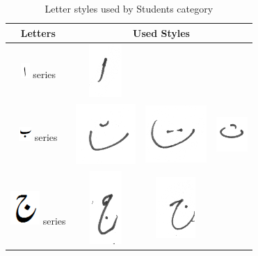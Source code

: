 \documentclass[a4paper,conference]{IEEEtran}
\begin{document}
\begin{table}[h]
\centering
\caption{Letter styles used by Students category}\label{tab6-student}
\begin{tabular}{@{}cccc@{}}
\hline
Letters	& \multicolumn{3}{c}{\textbf{Used Styles}} \\ \hline
\includegraphics[scale=0.50]{alif.png} series & \includegraphics[scale=0.25]{182} &  &   \\ 
\hline
\includegraphics[scale=0.50]{bay} series & \includegraphics[scale=0.15]{183} & \includegraphics[scale=0.20]{184} &
\includegraphics[scale=0.20]{185}  \\
\hline
\includegraphics[scale=0.25]{jeeem} series & \includegraphics[scale=0.20]{186} & \includegraphics[scale=0.20]{187} &

\end{tabular}
\end{table}
\end{document}
